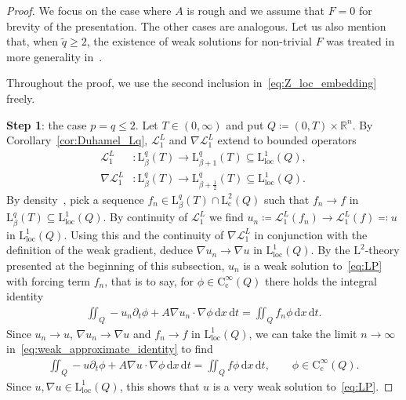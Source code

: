 \documentclass[11pt, leqno]{amsart}
\theoremstyle{definition}
\newcommand{\R}{\mathbb{R}}
\renewcommand{\L}{\mathrm{L}}
\newcommand{\Soll}{\mathcal{L}}
\newcommand{\Cont}{\mathrm{C}}
\renewcommand{\d}{\,\mathrm{d}}
\newcommand{\cc}{\mathrm{c}}
\newcommand{\loc}{\mathrm{loc}}
\begin{document}
	\begin{proof}
		We focus on the case where $A$ is rough and we assume that $F = 0$ for brevity of the presentation.
		The other cases are analogous.
		Let us also mention that, when $\tilde q \geq 2$, the existence of weak solutions for non-trivial $F$ was treated in more generality in~\cite{AH3}.

		Throughout the proof, we use the second inclusion in~\eqref{eq:Z_loc_embedding} freely.

		\textbf{Step 1}: the case $p = q \leq 2$.
		Let $T \in (0,\infty)$ and put $Q \coloneqq (0,T) \times \R^n$.
		By Corollary~\ref{cor:Duhamel_Lq}, $\Soll^L_1$ and $\nabla \Soll^L_1$ extend to bounded operators
		\begin{align}
			\Soll^L_1 &\colon \L^q_\beta(T) \to \L^q_{\beta + 1}(T) \subseteq \L^1_\loc(Q), \\
			\nabla \Soll^L_1 &\colon \L^q_\beta(T) \to \L^q_{\beta + \frac{1}{2}}(T) \subseteq \L^1_\loc(Q).
		\end{align}
		By density~\cite[Ex.~9.4.1]{GrafakosModern}, pick a sequence $f_n \in \L^q_\beta(T) \cap \L^2_\cc(Q)$ such that $f_n \to f$ in $\L^q_\beta(T) \subseteq \L^1_\loc(Q)$. By continuity of $\Soll^L_1$ we find $u_n \coloneqq \Soll^L_1(f_n) \to \Soll^L_1(f) \eqqcolon u$ in $\L^1_\loc(Q)$. Using this and the continuity of $\nabla \Soll^L_1$ in conjunction with the definition of the weak gradient, deduce $\nabla u_n \to \nabla u$ in $\L^1_\loc(Q)$. By the $\L^2$-theory presented at the beginning of this subsection, $u_n$ is a weak solution to~\eqref{eq:LP} with forcing term $f_n$, that is to say, for $\phi \in \Cont^\infty_\cc(Q)$ there holds the integral identity
		\begin{align}
			\label{eq:weak_approximate_identity}
			\iint_Q -u_n \partial_t \phi + A \nabla u_n \cdot \nabla \phi \d x \d t = \iint_Q f_n \phi \d x \d t.
		\end{align}
		Since $u_n \to u$, $\nabla u_n \to \nabla u$ and $f_n \to f$ in $\L^1_\loc(Q)$, we can take the limit $n\to \infty$ in~\eqref{eq:weak_approximate_identity} to find
		\begin{align}
			\iint_Q -u \partial_t \phi + A \nabla u \cdot \nabla \phi \d x \d t = \iint_Q f \phi \d x \d t, \qquad \phi \in \Cont^\infty_\cc(Q).
		\end{align}
		Since $u, \nabla u \in \L^1_\loc(Q)$, this shows that $u$ is a very weak solution to~\eqref{eq:LP}.


\end{proof}
\end{document}
